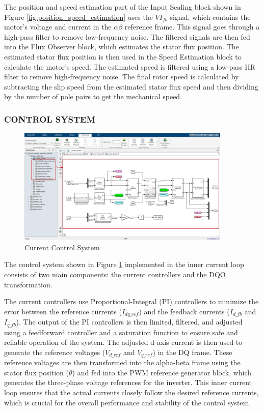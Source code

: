 The position and speed estimation part of the Input Scaling block shown in  Figure \ref{fig:position_speed_estimation} uses the $VI_{fb}$ signal, which contains the motor's voltage and current in the $\alpha \beta$ reference frame. This signal goes through a high-pass filter to remove low-frequency noise. The filtered signals are then fed into the Flux Observer block, which estimates the stator flux position. The estimated stator flux position is then used in the Speed Estimation block to calculate the motor's speed. The estimated speed is filtered using a low-pass IIR filter to remove high-frequency noise. The final rotor speed is calculated by subtracting the slip speed from the estimated stator flux speed and then dividing by the number of pole pairs to get the mechanical speed.

\subsubsection{CONTROL SYSTEM}



\begin{figure}[H]
	\centering
	\includegraphics[width=4in]{sections/section3/images/simulation/currentControl/controlSystem.png}
	\caption{Current Control System}
	\label{fig:current_control_system}
\end{figure}


The control system shown in Figure \ref{fig:current_control_system} implemented in the inner current loop consists of two main components: the current controllers and the DQO transformation.

The current controllers use Proportional-Integral (PI) controllers to minimize the error between the reference currents ($I_{dq\_ref}$) and the feedback currents ($I_{d\_fb}$ and $I_{q\_fb}$). The output of the PI controllers is then limited, filtered, and adjusted using a feedforward controller and a saturation function to ensure safe and reliable operation of the system. The adjusted d-axis current is then used to generate the reference voltages ($V_{d\_ref}$ and $V_{q\_ref}$) in the DQ frame. These reference voltages are then transformed into the alpha-beta frame using the stator flux position ($\theta$) and fed into the PWM reference generator block, which generates the three-phase voltage references for the inverter. This inner current loop ensures that the actual currents closely follow the desired reference currents, which is crucial for the overall performance and stability of the control system.



